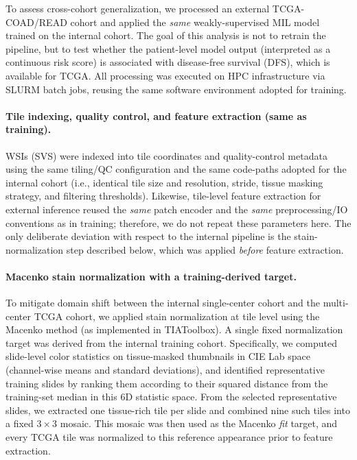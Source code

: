 To assess cross-cohort generalization, we processed an external TCGA-COAD/READ cohort and applied the \emph{same} weakly-supervised MIL model trained on the internal cohort. The goal of this analysis is not to retrain the pipeline, but to test whether the patient-level model output (interpreted as a continuous risk score) is associated with disease-free survival (DFS), which is available for TCGA. All processing was executed on HPC infrastructure via SLURM batch jobs, reusing the same software environment adopted for training.

\paragraph{Tile indexing, quality control, and feature extraction (same as training).}
WSIs (SVS) were indexed into tile coordinates and quality-control metadata using the same tiling/QC configuration and the same code-paths adopted for the internal cohort (i.e., identical tile size and resolution, stride, tissue masking strategy, and filtering thresholds). Likewise, tile-level feature extraction for external inference reused the \emph{same} patch encoder and the \emph{same} preprocessing/IO conventions as in training; therefore, we do not repeat these parameters here. The only deliberate deviation with respect to the internal pipeline is the stain-normalization step described below, which was applied \emph{before} feature extraction.

\paragraph{Macenko stain normalization with a training-derived target.}
To mitigate domain shift between the internal single-center cohort and the multi-center TCGA cohort, we applied stain normalization at tile level using the Macenko method (as implemented in TIAToolbox). A single fixed normalization target was derived from the internal training cohort. Specifically, we computed slide-level color statistics on tissue-masked thumbnails in CIE Lab space (channel-wise means and standard deviations), and identified representative training slides by ranking them according to their squared distance from the training-set median in this 6D statistic space. From the selected representative slides, we extracted one tissue-rich tile per slide and combined nine such tiles into a fixed $3\times 3$ mosaic. This mosaic was then used as the Macenko \emph{fit} target, and every TCGA tile was normalized to this reference appearance prior to feature extraction.


